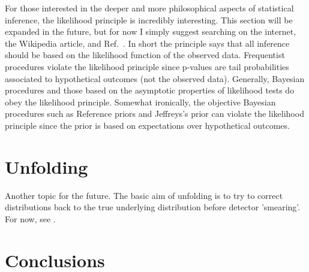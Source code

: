 \documentclass{cernrep}
\begin{document}
For those interested in the deeper and more philosophical aspects of statistical inference, the likelihood principle is incredibly interesting.  This section will be expanded in the future, but for now I simply suggest searching on the internet, the Wikipedia article, and Ref.~\cite{Birnbaum:1962}.  In short the principle says that all inference should be based on the likelihood function of the observed data.  Frequentist procedures violate the likelihood principle since p-values are tail probabilities associated to hypothetical outcomes (not the observed data).  Generally, Bayesian procedures and those based on the asymptotic properties of likelihood tests do obey the likelihood principle.  Somewhat ironically, the objective Bayesian procedures such as Reference priors and Jeffreys's prior can violate the likelihood principle since the prior is based on expectations over hypothetical outcomes.




%


\section{Unfolding}
Another topic for the future.  The basic aim of unfolding is to try to correct distributions back to the true underlying distribution before  detector 'smearing'.  For now, see \cite{Prosper:1306523,DAgostini1995487,Adye:2011gm,Malaescu:2011yg,Blobel:2002pu,Hocker:1995kb,Choudalakis2012,Tikhonov}.

\section{Conclusions}
\end{document}
